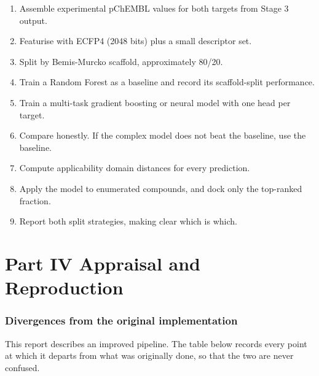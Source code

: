 \documentclass[11pt,a4paper]{article}
\begin{document}
\begin{enumerate}
\item Assemble experimental pChEMBL values for both targets from Stage 3 output.
\item Featurise with ECFP4 (2048 bits) plus a small descriptor set.
\item Split by Bemis-Murcko scaffold, approximately 80/20.
\item Train a Random Forest as a baseline and record its scaffold-split
performance.
\item Train a multi-task gradient boosting or neural model with one head per
target.
\item Compare honestly. If the complex model does not beat the baseline, use the
baseline.
\item Compute applicability domain distances for every prediction.
\item Apply the model to enumerated compounds, and dock only the top-ranked
fraction.
\item Report both split strategies, making clear which is which.
\end{enumerate}

\newpage
\part*{Part IV \quad Appraisal and Reproduction}

\section{Divergences from the original implementation}

This report describes an improved pipeline. The table below records every point
at which it departs from what was originally done, so that the two are never
confused.
\end{document}
